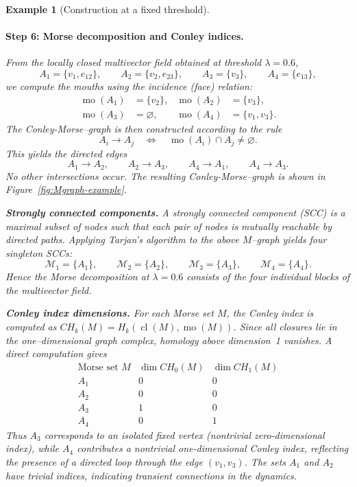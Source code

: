 \documentclass{article}
\theoremstyle{definition}
\theoremstyle{plain}
\newtheorem{example}{Example}
\theoremstyle{remark}
\newcommand{\1}{\mathbbm{1}}  %
\begin{document}
\begin{example}[Construction at a fixed threshold]
\paragraph{Step 6: Morse decomposition and Conley indices.}

From the locally closed multivector field obtained at threshold
$\lambda=0.6$,
\[
A_1=\{v_1,e_{12}\}, \qquad
A_2=\{v_2,e_{23}\}, \qquad
A_3=\{v_3\}, \qquad
A_4=\{e_{13}\},
\]
we compute the mouths using the incidence (face) relation:
\[
\begin{aligned}
\operatorname{mo}(A_1)&=\{v_2\}, &
\operatorname{mo}(A_2)&=\{v_3\}, \\
\operatorname{mo}(A_3)&=\varnothing, &
\operatorname{mo}(A_4)&=\{v_1,v_3\}.
\end{aligned}
\]
The Conley-Morse--graph is then constructed according to the rule
\[
A_i \longrightarrow A_j
\quad\Longleftrightarrow\quad
\operatorname{mo}(A_i)\cap A_j\neq\varnothing.
\]
This yields the directed edges
\[
A_1\to A_2, \qquad
A_2\to A_3, \qquad
A_4\to A_1, \qquad
A_4\to A_3.
\]
No other intersections occur.  The resulting Conley-Morse--graph is shown in
Figure~\ref{fig:Mgraph-example}.

\medskip\noindent
\textbf{Strongly connected components.}
A strongly connected component (SCC) is a maximal subset of nodes
such that each pair of nodes is mutually reachable by directed paths.
Applying Tarjan’s algorithm to the above $M$--graph yields four singleton
SCCs:
\[
\mathcal{M}_1=\{A_1\},\qquad
\mathcal{M}_2=\{A_2\},\qquad
\mathcal{M}_3=\{A_3\},\qquad
\mathcal{M}_4=\{A_4\}.
\]
Hence the Morse decomposition at $\lambda=0.6$ consists of the four
individual blocks of the multivector field.

\medskip\noindent
\textbf{Conley index dimensions.}
For each Morse set $M$, the Conley index is computed as
$CH_k(M)=H_k(\operatorname{cl}(M),\operatorname{mo}(M))$.
Since all closures lie in the one--dimensional graph complex,
homology above dimension~1 vanishes.
A direct computation gives
\[
\begin{array}{c|cc}
\text{Morse set } M & \dim CH_0(M) & \dim CH_1(M) \\
\hline
A_1 & 0 & 0\\
A_2 & 0 & 0\\
A_3 & 1 & 0\\
A_4 & 0 & 1
\end{array}
\]
Thus $A_3$ corresponds to an isolated fixed vertex
(nontrivial zero-dimensional index), while $A_4$ contributes a
nontrivial one-dimensional Conley index, reflecting the presence of a
directed loop through the edge $(v_1,v_3)$.
The sets $A_1$ and $A_2$ have trivial indices, indicating transient
connections in the dynamics.




\end{example}
\end{document}
